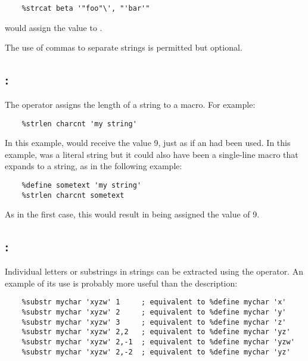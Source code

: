 \begin{lstlisting}
    %strcat beta '"foo"\', "'bar'"
\end{lstlisting}

would assign the value 
to .

The use of commas to separate strings is permitted but optional.

\subsection{: }
\label{subsec:strlen}

The  operator assigns the length of a string to a macro.
For example:

\begin{lstlisting}
    %strlen charcnt 'my string'
\end{lstlisting}

In this example,  would receive the value 9, just as
if an  had been used. In this example, 
was a literal string but it could also have been a single-line
macro that expands to a string, as in the following example:

\begin{lstlisting}
    %define sometext 'my string'
    %strlen charcnt sometext
\end{lstlisting}

As in the first case, this would result in  being
assigned the value of 9.

\subsection{: }
\label{subsec:substr}

Individual letters or substrings in strings can be extracted using the
 operator. An example of its use is probably more useful
than the description:

\begin{lstlisting}
    %substr mychar 'xyzw' 1     ; equivalent to %define mychar 'x'
    %substr mychar 'xyzw' 2     ; equivalent to %define mychar 'y'
    %substr mychar 'xyzw' 3     ; equivalent to %define mychar 'z'
    %substr mychar 'xyzw' 2,2   ; equivalent to %define mychar 'yz'
    %substr mychar 'xyzw' 2,-1  ; equivalent to %define mychar 'yzw'
    %substr mychar 'xyzw' 2,-2  ; equivalent to %define mychar 'yz'
\end{lstlisting}

